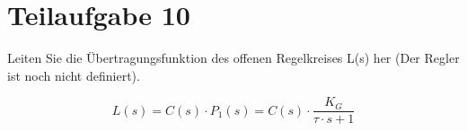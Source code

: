 \section{Teilaufgabe 10}
\begin{aufgabe}
    Leiten Sie die Übertragungsfunktion des offenen Regelkreises L(s) her (Der 
    Regler ist noch nicht definiert).
\end{aufgabe}
\[ L(s) = C(s) \cdot P_1(s) = C(s) \cdot \frac{K_G}{\tau \cdot s + 1} \]
